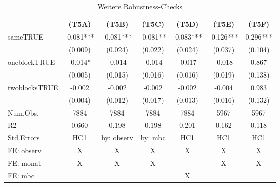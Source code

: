 \documentclass[
  a4paper,
  DIV=11,
  oneside]{scrreprt}
\newenvironment{Shaded}{\begin{snugshade}}{\end{snugshade}}
\newcommand{\AttributeTok}[1]{\textcolor[rgb]{0.40,0.45,0.13}{#1}}
\newcommand{\CommentTok}[1]{\textcolor[rgb]{0.37,0.37,0.37}{#1}}
\newcommand{\DecValTok}[1]{\textcolor[rgb]{0.68,0.00,0.00}{#1}}
\newcommand{\FunctionTok}[1]{\textcolor[rgb]{0.28,0.35,0.67}{#1}}
\newcommand{\NormalTok}[1]{\textcolor[rgb]{0.00,0.23,0.31}{#1}}
\newcommand{\OtherTok}[1]{\textcolor[rgb]{0.00,0.23,0.31}{#1}}
\newcommand{\SpecialCharTok}[1]{\textcolor[rgb]{0.37,0.37,0.37}{#1}}
\newcommand{\StringTok}[1]{\textcolor[rgb]{0.13,0.47,0.30}{#1}}
\begin{document}
\begin{Shaded}
\end{Shaded}

\setlength{\LTpost}{0mm}

\begin{longtable}{lcccccc}

\caption{\label{tbl-pprobust}Weitere Robustness-Checks}

\tabularnewline

\toprule
  & (T5A) & (T5B) & (T5C) & (T5D) & (T5E) & (T5F) \\ 
\midrule\addlinespace[2.5pt]
sameTRUE & -0.081*** & -0.081*** & -0.081** & -0.083*** & -0.126*** & 0.296*** \\ 
 & (0.009) & (0.024) & (0.022) & (0.024) & (0.037) & (0.104) \\ 
oneblockTRUE & -0.014* & -0.014 & -0.014 & -0.017 & -0.018 & 0.867 \\ 
 & (0.005) & (0.015) & (0.016) & (0.016) & (0.019) & (0.138) \\ 
twoblocksTRUE & -0.002 & -0.002 & -0.002 & -0.002 & -0.004 & 0.983 \\ 
 & (0.004) & (0.012) & (0.017) & (0.013) & (0.016) & (0.132) \\ 
Num.Obs. & 7884 & 7884 & 7884 & 7884 & 5967 & 5967 \\ 
R2 & 0.660 & 0.198 & 0.198 & 0.201 & 0.162 & 0.118 \\ 
Std.Errors & HC1 & by: observ & by: mbc & HC1 & HC1 & HC1 \\ 
FE: observ & X & X & X & X & X & X \\ 
FE: monat & X & X & X &  & X & X \\ 
FE: mbc &  &  &  & X &  &  \\ 
\bottomrule

\end{longtable}
\end{document}
